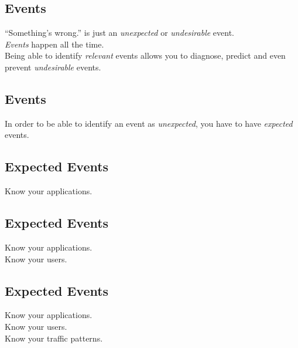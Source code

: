 \documentclass[xga]{xdvislides}
\begin{document}
\subsection{Events}
\vspace*{\fill}
\Huge
\begin{center}
``Something's wrong.'' is just an {\em unexpected} or
{\em undesirable} event. \\
\vspace{.4in}
{\em Events} happen all the time. \\
\vspace{.4in}
Being able to identify {\em relevant} events allows
you to diagnose, predict and even prevent {\em
undesirable} events.
\end{center}
\Normalsize
\vspace*{\fill}

\subsection{Events}
\vspace*{\fill}
\Huge
\begin{center}
In order to be able to identify an event as {\em
unexpected}, you have to have {\em expected} events.
\end{center}
\Normalsize
\vspace*{\fill}

\subsection{Expected Events}
\vspace*{\fill}
\Huge
\begin{center}
Know your applications.
\end{center}
\Normalsize
\vspace*{\fill}

\subsection{Expected Events}
\vspace*{\fill}
\Huge
\begin{center}
Know your applications. \\
\vspace{.4in}
Know your users.
\end{center}
\Normalsize
\vspace*{\fill}

\subsection{Expected Events}
\vspace*{\fill}
\Huge
\begin{center}
Know your applications. \\
\vspace{.4in}
Know your users. \\
\vspace{.4in}
Know your traffic patterns.
\end{center}
\Normalsize
\vspace*{\fill}
\end{document}
